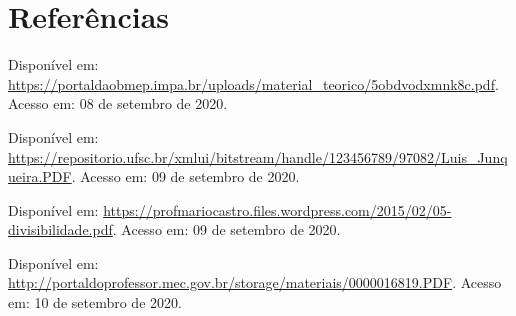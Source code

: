 \documentclass[10pt]{article}
\begin{document}
\vfill
\section*{Referências}
\noindent Disponível em: \url{https://portaldaobmep.impa.br/uploads/material_teorico/5obdvodxmnk8c.pdf}. Acesso em: 08 de setembro de 2020.

\noindent Disponível em: 
\url{https://repositorio.ufsc.br/xmlui/bitstream/handle/123456789/97082/Luis_Junqueira.PDF}. Acesso em: 09 de setembro de 2020.

\noindent Disponível em: 
\url{https://profmariocastro.files.wordpress.com/2015/02/05-divisibilidade.pdf}. Acesso em: 09 de setembro de 2020.

\noindent Disponível em: 
\url{http://portaldoprofessor.mec.gov.br/storage/materiais/0000016819.PDF}. Acesso em: 10 de setembro de 2020.
\end{document}
